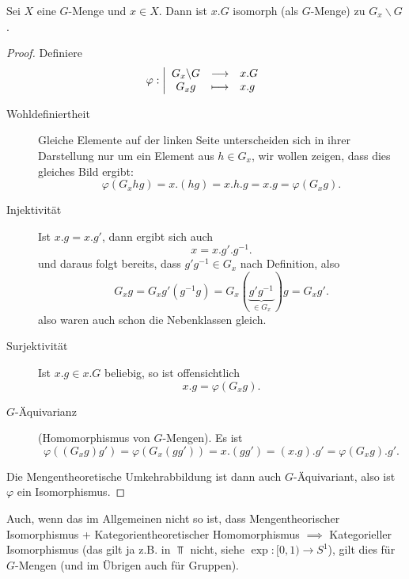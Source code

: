 \begin{lemma}
    Sei $X$ eine  $G$-Menge und  $x\in X$. Dann ist $x.G$ isomorph (als  $G$-Menge) zu  $G_x \backslash G$.
\end{lemma}
\begin{proof}
    Definiere
        \begin{equation*}
        \varphi : \left| \begin{array}{c c l} 
        G_x \backslash G & \longrightarrow & x.G \\
        G_xg & \longmapsto &  x.g
        \end{array} \right.
    \end{equation*}
    \begin{description}
        \item[Wohldefiniertheit] Gleiche Elemente auf der linken Seite unterscheiden sich in ihrer Darstellung nur um ein Element aus $h\in G_x$, wir wollen zeigen, dass dies gleiches Bild ergibt:
            \[
                \varphi (G_xhg) = x.(hg) = x.h.g = x.g = \varphi (G_xg)
            .\] 
        \item[Injektivität] Ist $x.g = x.g'$, dann ergibt sich auch
             \[
            x = x.g'.g^{-1}
            .\] 
            und daraus folgt bereits, dass $g'g^{-1} \in G_x$ nach Definition, also
            \[
                G_xg = G_xg'(g^{-1}g) = G_x(\underbrace{g'g^{-1}}_{\in G_x})g = G_xg'
            .\] 
            also waren auch schon die Nebenklassen gleich.
        \item[Surjektivität] Ist $x.g\in x.G$ beliebig, so ist offensichtlich
            \[
                x.g = \varphi (G_xg)
            .\] 
        \item[$G$-Äquivarianz] (Homomorphismus von $G$-Mengen). Es ist
             \[
                 \varphi ((G_xg)g') = \varphi (G_x(gg')) = x.(gg') = (x.g).g' = \varphi (G_xg).g'
            .\] 
    \end{description}
    Die Mengentheoretische Umkehrabbildung ist dann auch $G$-Äquivariant, also ist  $\varphi $ ein Isomorphismus.
\end{proof}

    \begin{oral}
        Auch, wenn das im Allgemeinen nicht so ist, dass Mengentheorischer Isomorphismus + Kategorientheoretischer Homomorphismus $\implies$ Kategorieller Isomorphismus (das gilt ja z.B. in $\Top$ nicht, siehe  $\exp \colon  [0,1) \to  S^1$), gilt dies für $G$-Mengen (und im Übrigen auch für Gruppen).
    \end{oral}

